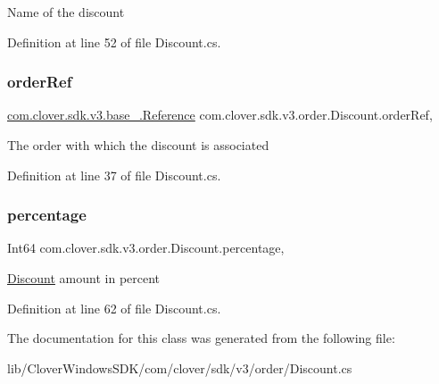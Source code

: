 Name of the discount 



Definition at line 52 of file Discount.\+cs.

\mbox{\label{classcom_1_1clover_1_1sdk_1_1v3_1_1order_1_1_discount_a58b38e2a47d6bd4f0b1ee9353dd0d7a0}} 
\subsubsection{\texorpdfstring{order\+Ref}{orderRef}}
{\footnotesize\ttfamily \hyperlink{classcom_1_1clover_1_1sdk_1_1v3_1_1base___1_1_reference}{com.\+clover.\+sdk.\+v3.\+base\+\_\+.\+Reference} com.\+clover.\+sdk.\+v3.\+order.\+Discount.\+order\+Ref\hspace{0.3cm}{\ttfamily [get]}, {\ttfamily [set]}}



The order with which the discount is associated 



Definition at line 37 of file Discount.\+cs.

\mbox{\label{classcom_1_1clover_1_1sdk_1_1v3_1_1order_1_1_discount_a060312534890beb01ad9cc302ecc141f}} 
\subsubsection{\texorpdfstring{percentage}{percentage}}
{\footnotesize\ttfamily Int64 com.\+clover.\+sdk.\+v3.\+order.\+Discount.\+percentage\hspace{0.3cm}{\ttfamily [get]}, {\ttfamily [set]}}



\hyperlink{classcom_1_1clover_1_1sdk_1_1v3_1_1order_1_1_discount}{Discount} amount in percent 



Definition at line 62 of file Discount.\+cs.



The documentation for this class was generated from the following file\+:\begin{DoxyCompactItemize}
\item 
lib/\+Clover\+Windows\+S\+D\+K/com/clover/sdk/v3/order/Discount.\+cs\end{DoxyCompactItemize}
